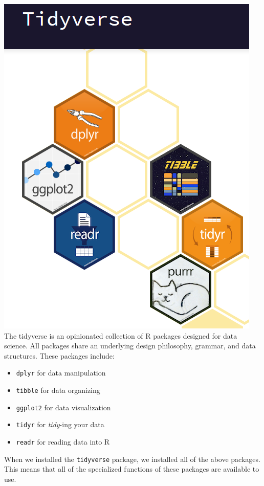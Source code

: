 \documentclass[
]{book}
\providecommand{\tightlist}{%
  \setlength{\itemsep}{0pt}\setlength{\parskip}{0pt}}
\begin{document}
\includegraphics{./figures/tidyverse.png}
The tidyverse is an opinionated collection of R packages designed for data science. All packages share an underlying design philosophy, grammar, and data structures. These packages include:

\begin{itemize}
\tightlist
\item
  \texttt{dplyr} for data manipulation
\item
  \texttt{tibble} for data organizing
\item
  \texttt{ggplot2} for data visualization
\item
  \texttt{tidyr} for \emph{tidy}-ing your data
\item
  \texttt{readr} for reading data into R
\end{itemize}

When we installed the \texttt{tidyverse} package, we installed all of the above packages. This means that all of the specialized functions of these packages are available to use.
\end{document}
